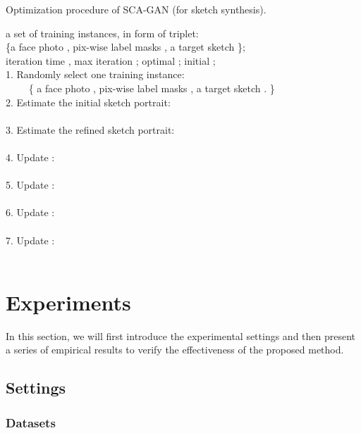 \documentclass[journal]{IEEEtran}
\begin{document}
\begin{algorithm}    
  \footnotesize
  \caption{Optimization procedure of SCA-GAN (for sketch synthesis).}  
  \label{alg:optimization}
  \begin{algorithmic} 
    \Require  
    	a set of training instances, in form of triplet: \\
     	\{a face photo , pix-wise label masks , a target sketch  \}; \\
     	iteration time , max iteration ;
    \Ensure  
        optimal ;  
    \State initial ; 
      \\
1. Randomly select one training instance: \\
~~~~ \{ a face photo , pix-wise label masks , a target sketch . \} \\
2. Estimate the initial sketch portrait: \\
~~~~ \\
3. Estimate the refined sketch portrait: \\
~~~~ \\
4. Update : \\
~~~~  \\
5. Update : \\
~~~~  \\
6. Update : \\
~~~~  \\
7. Update : \\
~~~~ 
    \EndFor 
  \end{algorithmic} 
\end{algorithm} 


\section{Experiments}
\label{sec:experiment}

In this section, we will first introduce the experimental settings and then present a series of empirical results to verify the effectiveness of the proposed method.  

\subsection{Settings}
\label{sec:settings}

\subsubsection{Datasets}
\label{sec:datasets}
\end{document}
